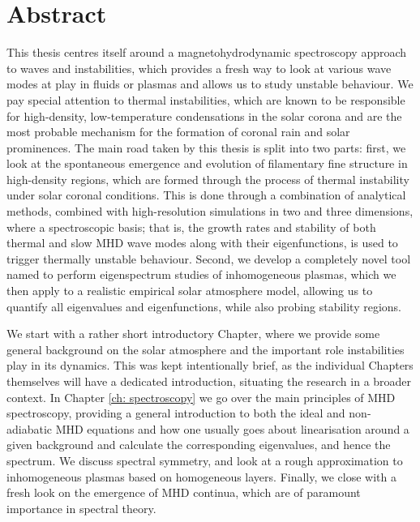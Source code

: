 \chapter*{Abstract} \label{ch: abstract}
This thesis centres itself around a magnetohydrodynamic spectroscopy approach to waves and instabilities, which provides a fresh way to look at various wave modes at play in fluids or plasmas and allows us to study unstable behaviour. We pay special attention to thermal instabilities, which are known to be responsible for high-density, low-temperature condensations in the solar corona and are the most probable mechanism for the formation of coronal rain and solar prominences. The main road taken by this thesis is split into two parts: first, we look at the spontaneous emergence and evolution of filamentary fine structure in high-density regions, which are formed through the process of thermal instability under solar coronal conditions. This is done through a combination of analytical methods, combined with high-resolution simulations in two and three dimensions, where a spectroscopic basis; that is, the growth rates and stability of both thermal and slow MHD wave modes along with their eigenfunctions, is used to trigger thermally unstable behaviour. Second, we develop a completely novel tool named {\legolas} to perform eigenspectrum studies of inhomogeneous plasmas, which we then apply to a realistic empirical solar atmosphere model, allowing us to quantify all eigenvalues and eigenfunctions, while also probing stability regions.

We start with a rather short introductory Chapter, where we provide some general background on the solar atmosphere and the important role instabilities play in its dynamics. This was kept intentionally brief, as the individual Chapters themselves will have a dedicated introduction, situating the research in a broader context. In Chapter \ref{ch: spectroscopy} we go over the main principles of MHD spectroscopy, providing a general introduction to both the ideal and non-adiabatic MHD equations and how one usually goes about linearisation around a given background and calculate the corresponding eigenvalues, and hence the spectrum. We discuss spectral symmetry, and look at a rough approximation to inhomogeneous plasmas based on homogeneous layers. Finally, we close with a fresh look on the emergence of MHD continua, which are of paramount importance in spectral theory.

